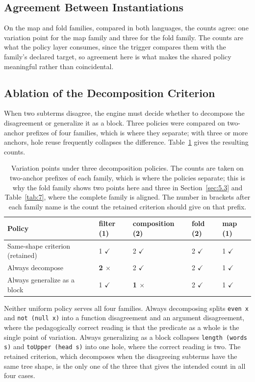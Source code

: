 \documentclass[journal]{IEEEtran}
\begin{document}
\subsection{Agreement Between Instantiations}\label{sec:8.2}
On the map and fold families, compared in both languages, the counts agree: one
variation point for the map family and three for the fold family. The counts
are what the policy layer consumes, since the trigger compares them with
the family's declared target, so agreement here is what makes the shared
policy meaningful rather than coincidental.

\subsection{Ablation of the Decomposition Criterion}\label{sec:8.3}
When two subterms disagree, the engine must decide whether to decompose
the disagreement or generalize it as a block. Three policies were
compared on two-anchor prefixes of four families, which is where they
separate; with three or more anchors, hole reuse frequently collapses
the difference. Table~\ref{tab:4} gives the resulting counts.

\begin{table}[t]
\centering\scriptsize\setlength{\tabcolsep}{3pt}
\caption{Variation points under three decomposition policies. The counts are taken on two-anchor prefixes of each family, which is where the policies separate; this is why the fold family shows two points here and three in Section~\ref{sec:5.3} and Table~\ref{tab:7}, where the complete family is aligned. The number in brackets after each family name is the count the retained criterion should give on that prefix.}\label{tab:4}
\begin{tabular}{@{}p{1.10in}p{0.46in}p{0.66in}p{0.44in}p{0.44in}@{}}
\toprule
Policy & filter (1) & composition (2) & fold (2) & map (1) \\
\midrule
Same-shape criterion (retained) & 1 $\checkmark$ & 2 $\checkmark$ & 2 $\checkmark$ & 1 $\checkmark$ \\
Always decompose & \textbf{2 $\times$} & 2 $\checkmark$ & 2 $\checkmark$ & 1 $\checkmark$ \\
Always generalize as a block & 1 $\checkmark$ & \textbf{1 $\times$} & 2 $\checkmark$ & 1 $\checkmark$ \\
\bottomrule
\end{tabular}
\end{table}

Neither uniform policy serves all four families. Always decomposing
splits \texttt{even x} and \texttt{not (null x)} into a function
disagreement and an argument disagreement, where the pedagogically
correct reading is that the predicate as a whole is the single point of
variation. Always generalizing as a block collapses
\texttt{length (words s)} and \texttt{toUpper (head s)} into one
hole, where the correct reading is two. The retained criterion, which
decomposes when the disagreeing subterms have the same tree shape, is
the only one of the three that gives the intended count in all four
cases.
\end{document}
